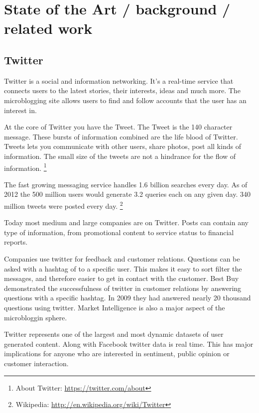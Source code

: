 \section{State of the Art / background / related work}

\subsection{Twitter}
Twitter is a social and information networking. It's a real-time service that
connects users to the latest stories, their interests, ideas and much more. The
microblogging site allows users to find and follow accounts that the user has
an interest in. 

At the core of Twitter you have the Tweet. The Tweet is the 140 character
message. These bursts of information combined are the life blood of Twitter.
Tweets lets you communicate with other users, share photos, post all kinds of
information. The small size of the tweets are not a hindrance for the flow of
information. 
\footnote{About Twitter: \url{https://twitter.com/about}}

The fast growing messaging service handles 1.6 billion searches every day.
As of 2012 the 500 million users would generate 3.2 queries each on any given
day. 340 million tweets were posted every day. 
\footnote{Wikipedia: \url{http://en.wikipedia.org/wiki/Twitter}} 

Today most medium and large companies are on Twitter. Posts can contain
any type of information, from promotional content to service status to
financial reports.  

Companies use twitter for feedback and customer relations. Questions can be
asked with a hashtag of to a specific user. This makes it easy to sort filter
the messages, and therefore easier to get in contact with the customer. Best
Buy demonstrated the successfulness of twitter in customer relations by
answering questions with a specific hashtag. In 2009 they had answered nearly
20 thousand questions using twitter. \cite[p1]{Li2013206}
Market Intelligence is also a major aspect of the microbloggin sphere.

Twitter represents one of the largest and most dynamic datasets of user
generated content. Along with Facebook twitter data is real time. This has major
implications for anyone who are interested in sentiment, public opinion or
customer interaction. \cite[]{sperious11}

